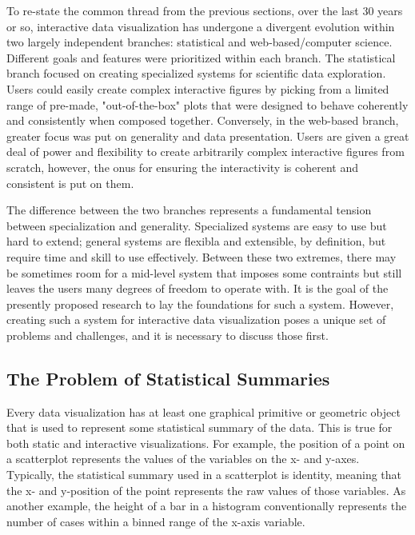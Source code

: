 \documentclass[12pt,a4paper]{article}
\begin{document}
To re-state the common thread from the previous sections, over the last 30 years or so, interactive data visualization has undergone a divergent evolution within two largely independent branches: statistical and web-based/computer science. Different goals and features were prioritized within each branch. The statistical branch focused on creating specialized systems for scientific data exploration. Users could easily create complex interactive figures by picking from a limited range of pre-made, "out-of-the-box" plots that were designed to behave coherently and consistently when composed together. Conversely, in the web-based branch, greater focus was put on generality and data presentation. Users are given a great deal of power and flexibility to create arbitrarily complex interactive figures from scratch, however, the onus for ensuring the interactivity is coherent and consistent is put on them.

The difference between the two branches represents a fundamental tension between specialization and generality. Specialized systems are easy to use but hard to extend; general systems are flexibla and extensible, by definition, but require time and skill to use effectively. Between these two extremes, there may be sometimes room for a mid-level system that imposes some contraints but still leaves the users many degrees of freedom to operate with. It is the goal of the presently proposed research to lay the foundations for such a system. However, creating such a system for interactive data visualization poses a unique set of problems and challenges, and it is necessary to discuss those first.

\subsection{The Problem of Statistical Summaries}

Every data visualization has at least one graphical primitive or geometric object that is used to represent some statistical summary of the data. This is true for both static and interactive visualizations. For example, the position of a point on a scatterplot represents the values of the variables on the x- and y-axes. Typically, the statistical summary used in a scatterplot is identity, meaning that the x- and y-position of the point represents the raw values of those variables. As another example, the height of a bar in a histogram conventionally represents the number of cases within a binned range of the x-axis variable. 
\end{document}
